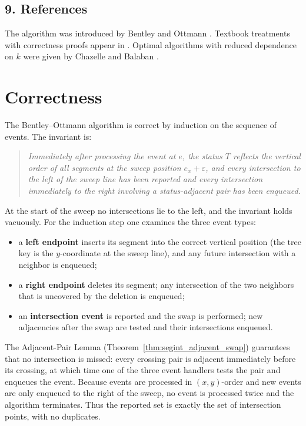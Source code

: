 \subsection{9. References}

The algorithm was introduced by Bentley and Ottmann \cite{bentley1979}.
Textbook treatments with correctness proofs appear in
\cite{preparata1985,berg2008}. Optimal algorithms with reduced dependence on
$k$ were given by Chazelle \cite{chazelle1992} and Balaban \cite{balaban1995}.

\section{Correctness}
\label{sec:segint_correctness}

The Bentley--Ottmann algorithm is correct by induction on the sequence of
events. The invariant is:
\begin{quote}
  \emph{Immediately after processing the event at $e$, the status $T$
  reflects the vertical order of all segments at the sweep position $e_x +
  \varepsilon$, and every intersection to the left of the sweep line has
  been reported and every intersection immediately to the right involving a
  status-adjacent pair has been enqueued.}
\end{quote}
At the start of the sweep no intersections lie to the left, and the invariant
holds vacuously. For the induction step one examines the three event types:
\begin{itemize}
  \item a \textbf{left endpoint} inserts its segment into the correct
    vertical position (the tree key is the $y$-coordinate at the sweep
    line), and any future intersection with a neighbor is enqueued;
  \item a \textbf{right endpoint} deletes its segment; any intersection of
    the two neighbors that is uncovered by the deletion is enqueued;
  \item an \textbf{intersection event} is reported and the swap is
    performed; new adjacencies after the swap are tested and their
    intersections enqueued.
\end{itemize}
The Adjacent-Pair Lemma (Theorem~\ref{thm:segint_adjacent_swap}) guarantees
that no intersection is missed: every crossing pair is adjacent immediately
before its crossing, at which time one of the three event handlers tests the
pair and enqueues the event. Because events are processed in
$(x,y)$-order and new events are only enqueued to the right of the sweep,
no event is processed twice and the algorithm terminates. Thus the reported
set is exactly the set of intersection points, with no duplicates.


